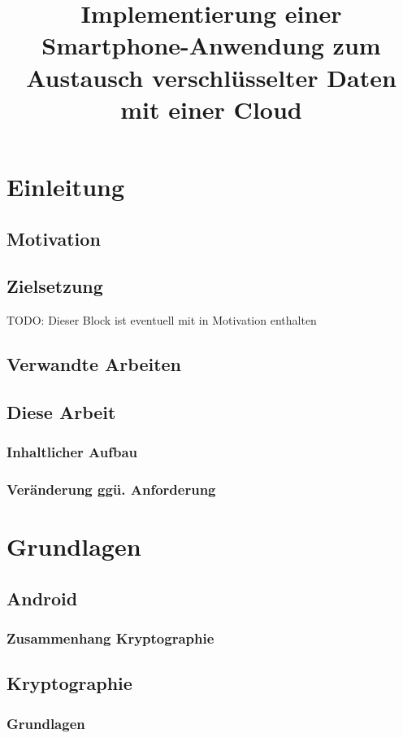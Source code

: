 \documentclass[11pt, a4paper]{scrreprt}
\title{Implementierung einer Smartphone-Anwendung zum Austausch verschlüsselter Daten mit einer Cloud}
\begin{document}
\titlepage
\maketitle
\tableofcontents

\part{Einleitung}
\chapter{Motivation}
\chapter{Zielsetzung}
TODO: Dieser Block ist eventuell mit in Motivation enthalten
\chapter{Verwandte Arbeiten}
\chapter{Diese Arbeit}
\section{Inhaltlicher Aufbau}
\section{Veränderung ggü. Anforderung}

\part{Grundlagen}
\chapter{Android}
\section{Zusammenhang Kryptographie}

\chapter{Kryptographie}
\section{Grundlagen}
\end{document}
